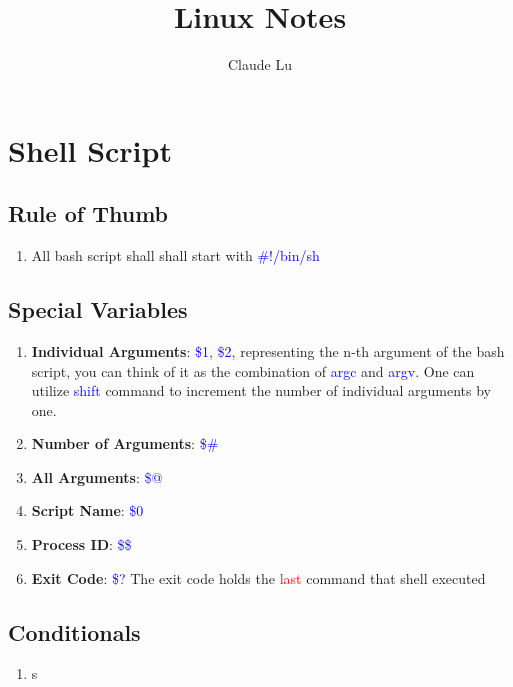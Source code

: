 \documentclass[12pt,a4paper]{article}
\title{Linux Notes}
\author{Claude Lu}
\newcommand{\rt}[1]{\textcolor{red}{#1}}
\newcommand{\bt}[1]{\textcolor{blue}{#1}}
\begin{document}
\maketitle
\section{Shell Script}
\subsection{Rule of Thumb}
\begin{enumerate}
	\item All bash script shall shall start with \bt{\#!/bin/sh}
\end{enumerate}

\subsection{Special Variables}
\begin{enumerate}
	\item \textbf{Individual Arguments}: \bt{\$1}, \bt{\$2}, representing the n-th argument of the bash script, you can think of it as the combination of \bt{argc} and \bt{argv}. One can utilize \bt{shift} command to increment the number of individual arguments by one.
	\item \textbf{Number of Arguments}: \bt{\$\#}
	\item \textbf{All Arguments}: \bt{\$@}
	\item \textbf{Script Name}: \bt{\$0}
	\item \textbf{Process ID}: \bt{\$\$}
	\item \textbf{Exit Code}: \bt{\$?} The exit code holds the \rt{last} command that shell executed
\end{enumerate}

\subsection{Conditionals}
\begin{enumerate}
	\item s
\end{enumerate}
\end{document}
